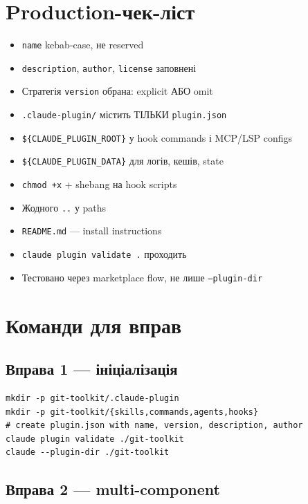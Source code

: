 \documentclass[11pt,a4paper]{article}
\begin{document}
\section{Production-чек-ліст}

\begin{itemize}[leftmargin=2em]
\item[$\square$] \texttt{name} kebab-case, не reserved
\item[$\square$] \texttt{description}, \texttt{author}, \texttt{license} заповнені
\item[$\square$] Стратегія \texttt{version} обрана: explicit АБО omit
\item[$\square$] \texttt{.claude-plugin/} містить ТІЛЬКИ \texttt{plugin.json}
\item[$\square$] \texttt{\$\{CLAUDE\_PLUGIN\_ROOT\}} у hook commands і MCP/LSP configs
\item[$\square$] \texttt{\$\{CLAUDE\_PLUGIN\_DATA\}} для логів, кешів, state
\item[$\square$] \texttt{chmod +x} + shebang на hook scripts
\item[$\square$] Жодного \texttt{..} у paths
\item[$\square$] \texttt{README.md} --- install instructions
\item[$\square$] \texttt{claude plugin validate .} проходить
\item[$\square$] Тестовано через marketplace flow, не лише \texttt{--plugin-dir}
\end{itemize}

\section{Команди для вправ}

\subsection{Вправа 1 --- ініціалізація}

\begin{lstlisting}
mkdir -p git-toolkit/.claude-plugin
mkdir -p git-toolkit/{skills,commands,agents,hooks}
# create plugin.json with name, version, description, author
claude plugin validate ./git-toolkit
claude --plugin-dir ./git-toolkit
\end{lstlisting}

\subsection{Вправа 2 --- multi-component}
\end{document}
